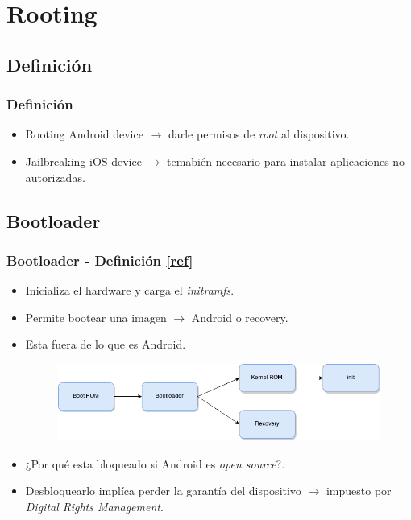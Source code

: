 \section{Rooting}

\subsection{Definición}
\begin{frame}
  \frametitle{Definición}
  \begin{itemize}
   \item Rooting Android device $\rightarrow$ darle permisos de \textit{root} al dispositivo.
   
   \item Jailbreaking iOS device $\rightarrow$ temabién necesario para instalar aplicaciones no autorizadas.
  \end{itemize}
\end{frame}

\subsection{Bootloader}
\begin{frame}
  \frametitle{Bootloader - Definición \href{https://forum.xda-developers.com/wiki/Bootloader\#Locked.2Funlocked\_bootloaders}{[ref]}}
  \begin{itemize}
      \item Inicializa el hardware y carga el \textit{initramfs}.
      
      \item Permite bootear una imagen $\rightarrow$ Android o recovery.
          
      \item Esta fuera de lo que es Android.
      
      \begin{figure}
	\centering
	\includegraphics[scale=0.4]{images/boot-sequence.png}
      \end{figure}
      
      \item ¿Por qué esta bloqueado si Android es \textit{open source}?.
      
      \item Desbloquearlo implíca perder la garantía del dispositivo $\rightarrow$ impuesto por \emph{Digital Rights Management}.
  \end{itemize}
\end{frame}

